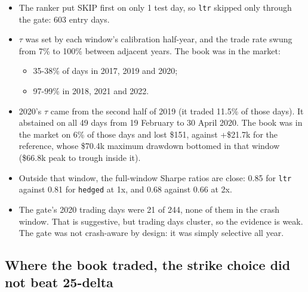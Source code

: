 \documentclass{article}
\begin{document}
\begin{itemize}

\item The ranker put SKIP first on only 1 test day, so \texttt{ltr} skipped only through the gate: 603 entry days.

\item $\tau$ was set by each window's calibration half-year, and the trade rate swung from 7\% to 100\% between adjacent years. The book was in the market:

\begin{itemize}

\item 35-38\% of days in 2017, 2019 and 2020;

\item 97-99\% in 2018, 2021 and 2022.

\end{itemize}

\item 2020's $\tau$ came from the second half of 2019 (it traded 11.5\% of those days). It abstained on all 49 days from 19 February to 30 April 2020. The book was in the market on 6\% of those days and lost \$151, against +\$21.7k for the reference, whose \$70.4k maximum drawdown bottomed in that window (\$66.8k peak to trough inside it).

\item Outside that window, the full-window Sharpe ratios are close: 0.85 for \texttt{ltr} against 0.81 for \texttt{hedged} at 1x, and 0.68 against 0.66 at 2x.

\item The gate's 2020 trading days were 21 of 244, none of them in the crash window. That is suggestive, but trading days cluster, so the evidence is weak. The gate was not crash-aware by design: it was simply selective all year.

\end{itemize}

\subsection{Where the book traded, the strike choice did not beat 25-delta}
\end{document}

